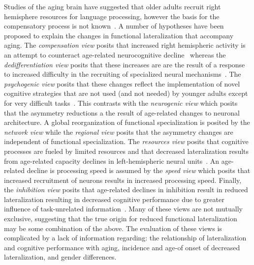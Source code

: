 Studies of the aging brain have suggested that older adults recruit right hemisphere resources for language processing, however the basis for the compensatory process is not known~\cite{Cabeza2002}. A number of hypotheses have been proposed to explain the changes in functional lateralization that accompany aging. The \emph{compensation view} posits that increased right hemispheric activity is an attempt to counteract age-related neurocognitive decline~\cite{Cabeza1997} whereas the \emph{dedifferentiation view} posits that these increases are are the result of a response to increased difficulty in the recruiting of specialized neural mechanisms~\cite{Li1999}. The \emph{psychogenic view} posits that these changes reflect the implementation of novel cognitive strategies that are not used (and not needed) by younger adults except for very difficult tasks~\cite{Light1991}. This contrasts with the \emph{neurogenic view} which posits that the asymmetry reductions a the result of age-related changes to neuronal architecture. A global reorganization of functional specialization is posited by the \emph{network view} while the \emph{regional view} posits that the asymmetry changes are independent of functional specialization. The \emph{resources view} posits that cognitive processes are fueled by limited resources and that decreased lateralization results from age-related capacity declines in left-hemispheric neural units~\cite{Craik1983}. An age-related decline is processing speed is assumed by the \emph{speed view} which posits that increased recruitment of neurons results in increased processing speed. Finally, the \emph{inhibition view} posits that age-related declines in inhibition result in reduced lateralization resulting in decreased cognitive performance due to greater influence of task-unrelated information~\cite{Hasher1988}. Many of these views are not mutually exclusive, suggesting that the true origin for reduced functional lateralization may be some combination of the above. The evaluation of these views is complicated by a lack of information regarding: the relationship of lateralization and cognitive performance with aging, incidence and age-of onset of decreased lateralization, and gender differences.

